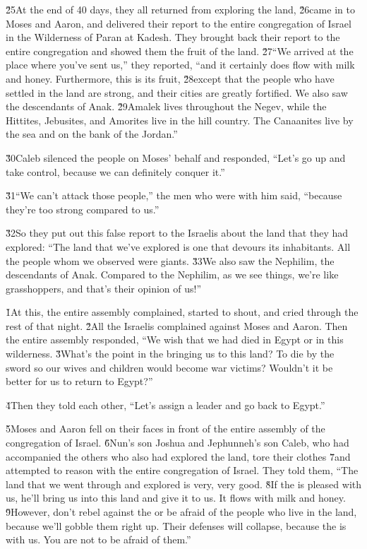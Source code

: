 \v{25}At the end of 40 days, they all returned from exploring the land, \v{26}came in to Moses and Aaron, and delivered their report to the entire congregation of Israel in the Wilderness of Paran at Kadesh. They brought back their report to the entire congregation and showed them the fruit of the land. \v{27}``We arrived at the place where you've sent us,'' they reported, ``and it certainly does flow with milk and honey. Furthermore, this is its fruit, \v{28}except that the people who have settled in the land are strong, and their cities are greatly fortified. We also saw the descendants of Anak. \v{29}Amalek lives throughout the Negev, while the Hittites, Jebusites, and Amorites live in the hill country. The Canaanites live by the sea and on the bank of the Jordan.''

\v{30}Caleb silenced the people on Moses' behalf and responded, ``Let's go up and take control, because we can definitely conquer it.''

\v{31}``We can't attack those people,'' the men who were with him said, ``because they're too strong compared to us.''

\v{32}So they put out this false report to the Israelis about the land that they had explored: ``The land that we've explored is one that devours its inhabitants. All the people whom we observed were giants. \v{33}We also saw the Nephilim, the descendants of Anak. Compared to the Nephilim, as we see things, we're like grasshoppers, and that's their opinion of us!''

\v{1}At this, the entire assembly complained, started to shout, and cried through the rest of that night. \v{2}All the Israelis complained against Moses and Aaron. Then the entire assembly responded, ``We wish that we had died in Egypt or in this wilderness. \v{3}What's the point in the  bringing us to this land? To die by the sword so our wives and children would become war victims? Wouldn't it be better for us to return to Egypt?''

\v{4}Then they told each other, ``Let's assign a leader and go back to Egypt.''

\v{5}Moses and Aaron fell on their faces in front of the entire assembly of the congregation of Israel. \v{6}Nun's son Joshua and Jephunneh's son Caleb, who had accompanied the others who also had explored the land, tore their clothes \v{7}and attempted to reason with the entire congregation of Israel. They told them, ``The land that we went through and explored is very, very good. \v{8}If the  is pleased with us, he'll bring us into this land and give it to us. It flows with milk and honey. \v{9}However, don't rebel against the  or be afraid of the people who live in the land, because we'll gobble them right up. Their defenses will collapse, because the  is with us. You are not to be afraid of them.''

